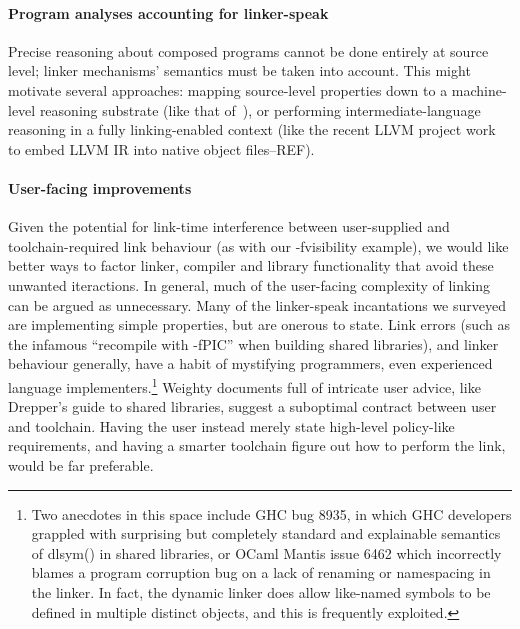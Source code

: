 \paragraph{Program analyses accounting for linker-speak}
Precise reasoning about composed programs cannot be done entirely at source level; 
linker mechanisms' semantics must be taken into account.
This might motivate several approaches: 
mapping source-level properties down to a
machine-level reasoning substrate (like that of~\cite{balakrishnan-wysinwyx-2010}),
or performing intermediate-language reasoning
in a fully linking-enabled context (like the recent LLVM project work
to embed LLVM IR into native object files--REF).

\paragraph{User-facing improvements}
Given the potential for link-time interference between user-supplied
and toolchain-required link behaviour (as with our \textsf{-fvisibility} example), 
we would like better ways to factor linker, compiler and library functionality
that avoid these unwanted iteractions.
In general, much of the user-facing complexity of linking
can be argued as unnecessary.
Many of the linker-speak incantations we surveyed 
are implementing simple properties, but are onerous to state. 
Link errors (such as the infamous ``recompile with -fPIC'' when building shared libraries),
and linker behaviour generally, have a habit of mystifying programmers,
even experienced language implementers.\footnote{Two 
anecdotes in this space include GHC bug 8935,
in which GHC developers grappled with surprising but completely standard
and explainable semantics of \textsf{dlsym()} in shared libraries, 
or OCaml Mantis issue 6462 which incorrectly blames a program corruption bug on a lack of 
renaming or namespacing in the linker.
In fact, the dynamic linker does allow like-named symbols to be defined in multiple 
distinct objects, and this is frequently exploited.}
Weighty documents full of intricate user advice, like Drepper's guide to shared libraries, 
suggest a suboptimal contract between user and toolchain.
Having the user instead merely state high-level policy-like requirements, 
and having a smarter toolchain figure out how to perform the link,
would be far preferable.


% 
% 
% 



